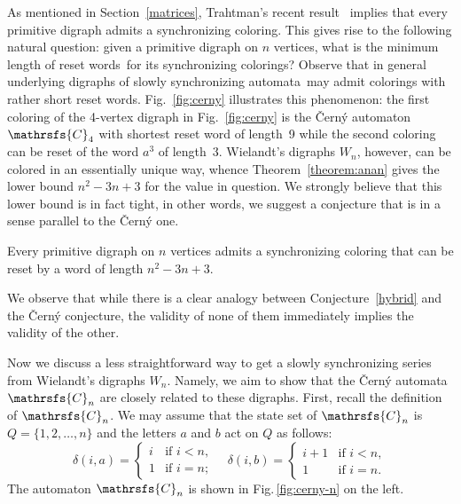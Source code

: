 \documentclass[11pt]{llncs}
\newcommand{\sa}{synchronizing automata}
\newcommand{\sws}{reset words}
\begin{document}
As mentioned in Section~\ref{matrices}, Trahtman's recent
result~\cite{Tr09} implies that every primitive digraph admits a
synchronizing coloring. This gives rise to the following natural
question: given a primitive digraph on $n$ vertices, what is the
minimum length of \sws\ for its synchronizing colorings? Observe
that in general underlying digraphs of slowly \sa\ may admit
colorings with rather short \sws. Fig.~\ref{fig:cerny} illustrates
this phenomenon: the first coloring of the 4-vertex digraph in
Fig.~\ref{fig:cerny} is the \v{C}ern\'{y} automaton
$\mathrsfs{C}_4$ with shortest reset word of length~9 while the
second coloring can be reset of the word $a^3$ of length~3.
Wielandt's digraphs $W_n$, however, can be colored in an
essentially unique way, whence Theorem~\ref{theorem:anan} gives
the lower bound $n^2-3n+3$ for the value in question. We strongly
believe that this lower bound is in fact tight, in other words, we
suggest a conjecture that is in a sense parallel to the
\v{C}ern\'{y} one.
\begin{conjecture}
\label{hybrid}
Every primitive digraph on $n$ vertices admits a synchronizing coloring
that can be reset by a word of length $n^2-3n+3$.
\end{conjecture}
We observe that while there is a clear analogy between Conjecture~\ref{hybrid}
and the \v{C}ern\'{y} conjecture, the validity of none of them immediately
implies the validity of the other.

Now we discuss a less straightforward way to get a slowly synchronizing series
from Wielandt's digraphs $W_n$. Namely, we aim to show that the \v{C}ern\'{y}
automata $\mathrsfs{C}_n$ are closely related to these digraphs. First, recall
the definition of $\mathrsfs{C}_n$. We may assume that the state set of
$\mathrsfs{C}_n$ is $Q=\{1,2,\dots,n\}$ and the letters $a$ and $b$ act
on $Q$ as follows:
$$\delta(i,a)=\begin{cases}
i &\text{if } i<n,\\
1 &\text{if } i=n;
\end{cases}\quad
\delta(i,b)=\begin{cases}
i+1 &\text{if } i<n,\\
1 &\text{if } i=n.
\end{cases}$$
The automaton $\mathrsfs{C}_n$ is shown in Fig.\,\ref{fig:cerny-n} on the left.
\end{document}
